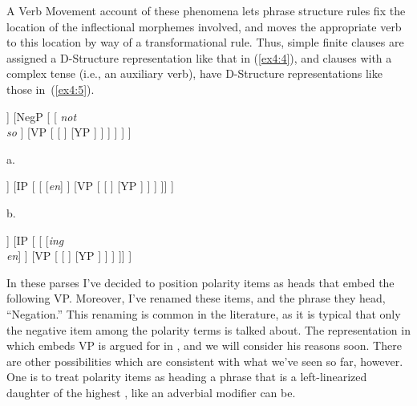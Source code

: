 A Verb Movement account of these phenomena lets phrase structure rules fix the location of the inflectional morphemes involved, and moves the appropriate verb to this location by way of a transformational rule. Thus, simple finite clauses are assigned a D-Structure representation like that in (\ref{ex4:4}), and clauses with a complex tense (i.e., an auxiliary verb), have D-Structure representations like those in~(\ref{ex4:5}).
\begin{exe}
\ex \label{ex4:4} \vspace*{-2pt}
\small
\begin{forest}
[\ibar{I}
	[\obar{I} [\emph{tns/agr}\\ \emph{modal}] ]
	[NegP	[
		[ \emph{not}\\\emph{so} ]
		[VP [
			[ ]
			[YP ]
		] ]
	] ]
]
\end{forest}
\vspace*{8pt}
\ex \label{ex4:5}
a. 
\small
\begin{forest}
[\ibar{V}
	[\obar{V}  [have]]
	[IP [
		[ [\emph{en}] ]
		[VP [
			[ ]
			[YP ]
		] ]
	]]
]
\end{forest}
\hspace*{12pt}
b. 
\small
\begin{forest}
[\ibar{V}
	[\obar{V} [be]]
	[IP [
		[ [\emph{ing}\\\emph{en}] ]
		[VP [
			[ ]
			[YP ]
		] ]
	]]
]
\end{forest}
\end{exe}
In these parses I've decided to position polarity items as heads that embed the following VP. Moreover, I've renamed these items, and the phrase they head, ``Negation.'' This renaming is common in the literature, as it is typical that only the negative item among the polarity terms is talked about. The representation in which  embeds VP is argued for in \citet{Pollock:1989}, and we will consider his reasons soon. There are other possibilities which are consistent with what we've seen so far, however. One is to treat polarity items as heading a phrase that is a left-linearized daughter of the highest , like an adverbial modifier can be.


